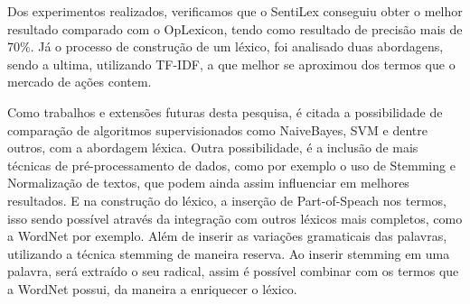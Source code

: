 \documentclass[conference]{IEEEtran}
\begin{document}
Dos experimentos realizados, verificamos que o SentiLex conseguiu obter o melhor resultado comparado com o OpLexicon, tendo como resultado de precisão mais de 70\%. Já o processo de construção de um léxico, foi analisado duas abordagens, sendo a ultima, utilizando TF-IDF, a que melhor se aproximou dos termos que o mercado de ações contem. 

Como trabalhos e extensões futuras desta pesquisa, é citada a possibilidade de comparação de algoritmos supervisionados como NaiveBayes, SVM e dentre outros, com a abordagem léxica. Outra possibilidade, é a inclusão de mais técnicas de pré-processamento de dados, como por exemplo o uso de Stemming e Normalização de textos, que podem ainda assim influenciar em melhores resultados. E na construção do léxico, a inserção de Part-of-Speach nos termos, isso sendo possível através da integração com outros léxicos mais completos, como a WordNet por exemplo. Além de inserir as variações gramaticais das palavras, utilizando a técnica stemming de maneira reserva. Ao inserir stemming em uma palavra, será extraído o seu radical, assim é possível combinar com os termos que a WordNet possui, da maneira a enriquecer o léxico. 







\end{document}
